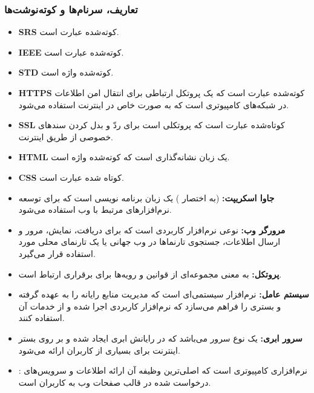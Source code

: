 \documentclass[12pt]{article}
\begin{document}
	\subsubsection{تعاریف، سرنام‌ها و کوته‌نوشت‌ها}
	\begin{itemize}
		\item
		\textbf{SRS\label{ref:srs}}
		کوته‌شده عبارت
		است.
		\item
		\textbf{IEEE\label{ref:ieee}}
		کوته‌شده عبارت
		است.
		\item
		\textbf{STD\label{ref:std}}
		کوته‌شده واژه
		است.
		\item
		\textbf{HTTPS\label{ref:https}}
		کوته‌شده عبارت
		است که یک پروتکل ارتباطی برای انتقال امن اطلاعات در شبکه‌های کامپیوتری است که به صورت خاص در اینترنت استفاده می‌شود.
		\item
		\textbf{SSL\label{ref:ssl}}
		کوتاه‌شده عبارت
		است که پروتکلی است برای ردّ و بدل کردن سندهای خصوصی از طریق اینترنت.
		\item
		\textbf{HTML\label{ref:html}}
		یک زبان نشانه‌گذاری است که کوته‌شده واژه
		است.
		\item
		\textbf{CSS\label{ref:css}}
		کوتاه شده عبارت
		است.
		\item
		\textbf{جاوا اسکریپت:\label{ref:js}}
		(به اختصار )
		یک زبان برنامه نویسی است که برای توسعه نرم‌افزارهای مرتبط با وب استفاده می‌شود.
		\item
		\textbf{مرورگر وب:\label{ref:browser}}
		نوعی نرم‌افزار کاربردی است که برای دریافت، نمایش، مرور و ارسال اطلاعات، جستجوی تارنماها در وب جهانی یا یک تارنمای محلی مورد استفاده قرار می‌گیرد.
		\item
		\textbf{پروتکل:\label{ref:protocol}}
		به معنی مجموعه‌ای از قوانین و رویه‌ها برای برقراری ارتباط است.
		\item
		\textbf{سیستم عامل:}
		نرم‌افزار سیستمی‌ای است که مدیریت منابع رایانه را به عهده گرفته و بستری را فراهم می‌سازد که نرم‌افزار کاربردی اجرا شده و از خدمات آن استفاده کنند.
		\item
		\textbf{سرور ابری:\label{ref:cs}}
		یک نوع سرور می‌باشد که در رایانش ابری ایجاد شده و بر روی بستر اینترنت برای بسیاری از کاربران ارائه می‌شود.
		\item
		\textbf{\label{ref:ws}}:
		نرم‌افزاری کامپیوتری است که اصلی‌ترین وظیفه آن ارائه اطلاعات و سرویس‌های درخواست شده در قالب صفحات وب به کاربران است.

\end{itemize}
\end{document}
